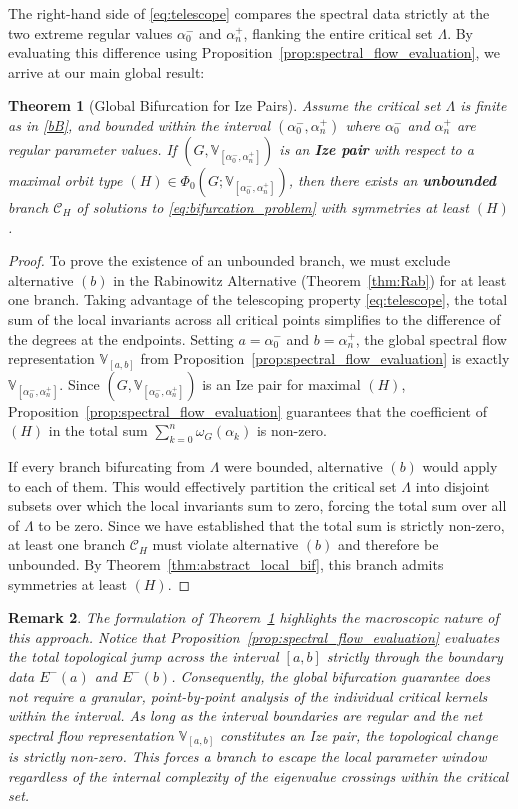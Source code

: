 \documentclass[twoside]{article}%
\newtheorem{theorem}{Theorem}[section]
\newtheorem{remark}[theorem]{Remark}
\begin{document}
The right-hand side of \eqref{eq:telescope} compares the spectral data strictly at the two extreme regular values $\alpha_0^-$ and $\alpha_n^+$, flanking the entire critical set $\Lambda$. By evaluating this difference using Proposition~\ref{prop:spectral_flow_evaluation}, we arrive at our main global result:
\begin{theorem}[Global Bifurcation for Ize Pairs]\label{thm:global_bif_ize}
Assume the critical set $\Lambda$ is finite as in \ref{bB}, and bounded within the interval $(\alpha_0^-, \alpha_n^+)$ where $\alpha_0^-$ and $\alpha_n^+$ are regular parameter values. If $(G, \mathbb V_{[\alpha_0^-,\alpha_n^+]})$ is an \textbf{Ize pair} with respect to a maximal orbit type $(H) \in \Phi_0(G; \mathbb V_{[\alpha_0^-,\alpha_n^+]})$, then there exists an \textbf{unbounded} branch $\mathscr C_H$ of solutions to \eqref{eq:bifurcation_problem} with symmetries at least $(H)$.
\end{theorem}
\begin{proof}
To prove the existence of an unbounded branch, we must exclude alternative $(b)$ in the Rabinowitz Alternative (Theorem~\ref{thm:Rab}) for at least one branch. Taking advantage of the telescoping property \eqref{eq:telescope}, the total sum of the local invariants across all critical points simplifies to the difference of the degrees at the endpoints. Setting $a = \alpha_0^-$ and $b = \alpha_n^+$, the global spectral flow representation $\mathbb V_{[a,b]}$ from Proposition~\ref{prop:spectral_flow_evaluation} is exactly $\mathbb V_{[\alpha_0^-,\alpha_n^+]}$. Since $(G, \mathbb V_{[\alpha_0^-,\alpha_n^+]})$ is an Ize pair for maximal $(H)$, Proposition~\ref{prop:spectral_flow_evaluation} guarantees that the coefficient of $(H)$ in the total sum $\sum_{k=0}^n \omega_{G}(\alpha_k)$ is non-zero. 

If every branch bifurcating from $\Lambda$ were bounded, alternative $(b)$ would apply to each of them. This would effectively partition the critical set $\Lambda$ into disjoint subsets over which the local invariants sum to zero, forcing the total sum over all of $\Lambda$ to be zero. Since we have established that the total sum is strictly non-zero, at least one branch $\mathscr C_H$ must violate alternative $(b)$ and therefore be unbounded. By Theorem~\ref{thm:abstract_local_bif}, this branch admits symmetries at least $(H)$.
\end{proof}
\begin{remark}\label{rem:infinite_lambda}\rm
The formulation of Theorem~\ref{thm:global_bif_ize} highlights the macroscopic nature of this approach. Notice that Proposition~\ref{prop:spectral_flow_evaluation} evaluates the total topological jump across the interval $[a,b]$ strictly through the boundary data $E^-(a)$ and $E^-(b)$. Consequently, the global bifurcation guarantee does not require a granular, point-by-point analysis of the individual critical kernels within the interval. As long as the interval boundaries are regular and the net spectral flow representation $\mathbb V_{[a,b]}$ constitutes an Ize pair, the topological change is strictly non-zero. This forces a branch to escape the local parameter window regardless of the internal complexity of the eigenvalue crossings within the critical set.
\end{remark}
\end{document}
